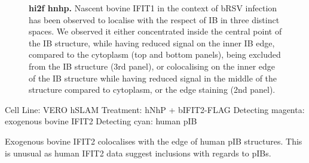 \begin{figure}
\begin{subfigure}{1\textwidth}
    \end{subfigure}
    \caption[hi2f hnhp]{\textbf{hi2f hnhp.} Nascent bovine IFIT1 in the context of bRSV infection has been observed to localise with the respect of IB in three distinct spaces. We observed it either concentrated inside the central point of the IB structure, while having reduced signal on the inner IB edge, compared to the cytoplasm (top and bottom panels), being excluded from the IB structure (3rd panel), or colocalising on the inner edge of the IB structure while having reduced signal in the middle of the structure compared to cytoplasm, or the edge staining (2nd panel).}
    \label{fig:hi2f hnhp}
\end{figure}

Cell Line: VERO hSLAM \newline
Treatment: hNhP + bIFIT2-FLAG \newline
Detecting magenta: exogenous bovine IFIT2 \newline
Detecting cyan: human pIB \newline

Exogenous bovine IFIT2 colocalises with the edge of human pIB structures. This is unusual as human IFIT2 data suggest inclusions with regards to pIBs.

